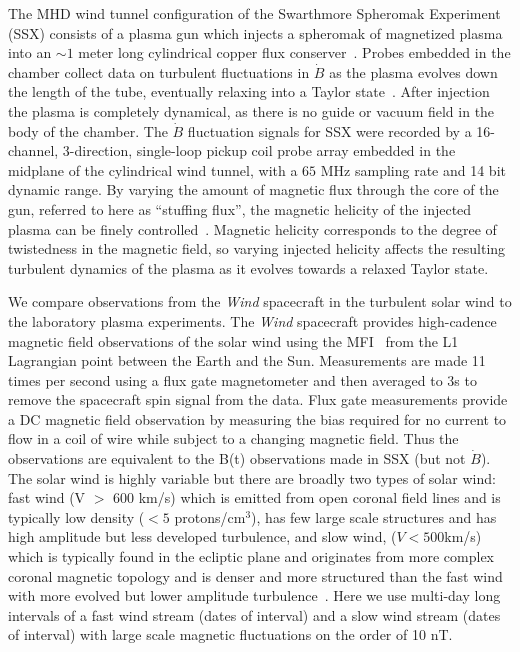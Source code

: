 \documentclass[aps,prx,twocolumn,secnumarabic,nobalancelastpage,amsmath,amssymb,
nofootinbib]{revtex4-1}
\begin{document}
The MHD wind tunnel configuration of the Swarthmore Spheromak Experiment (SSX) consists of a plasma gun which injects a spheromak of magnetized plasma into an $\sim1$ meter long cylindrical copper flux conserver~\cite{gray2013}. Probes embedded in the chamber collect data on turbulent fluctuations in $\dot{B}$ as the plasma evolves down the length of the tube, eventually relaxing into a Taylor state~\cite{gray2013,schaffner2014a,schaffner2014b,schaffner2014c}. After injection the plasma is completely dynamical, as there is no guide or vacuum field in the body of the chamber. The $\dot{B}$ fluctuation signals for SSX  were recorded by a 16-channel, 3-direction, single-loop pickup coil probe array embedded in the midplane of the cylindrical wind tunnel, with a $65$ MHz sampling rate and 14 bit dynamic range. By varying the amount of magnetic flux through the core of the gun, referred to here as ``stuffing flux'', the magnetic helicity of the injected plasma can be finely controlled~\cite{schaffner2014b}. Magnetic helicity corresponds to the degree of twistedness in the magnetic field, so varying injected helicity affects the resulting turbulent dynamics of the plasma as it evolves towards a relaxed Taylor state. 

We compare observations from the {\it Wind} spacecraft in the turbulent solar wind to the laboratory plasma experiments. The {\it Wind} spacecraft provides high-cadence magnetic field observations of the solar wind using the MFI~\cite{lepping1995} from the L1 Lagrangian point between the Earth and the Sun. Measurements are made 11 times per second using a flux gate magnetometer and then averaged to 3s to remove the spacecraft spin signal from the data. Flux gate measurements provide a DC magnetic field observation by measuring the bias required for no current to flow in a coil of wire while subject to a changing magnetic field. Thus the observations are equivalent to the B(t) observations made in SSX (but not $\dot{B}$). The solar wind is highly variable but there are broadly two types of solar wind: fast wind (V $>$ 600 km/s) which is emitted from open coronal field lines and is typically low density ($< 5$ protons/cm$^3$), has few large scale structures and has high amplitude but less developed turbulence, and slow wind, ($V < 500 $km/s) which is typically found in the ecliptic plane and originates from more complex coronal magnetic topology and is denser and more structured than the fast wind with more evolved but lower amplitude turbulence~\cite{tu1990,bruno2013}. Here we use multi-day long intervals of a fast wind stream (dates of interval) and a slow wind stream (dates of interval) with large scale magnetic fluctuations on the order of 10 nT. 
\end{document}
